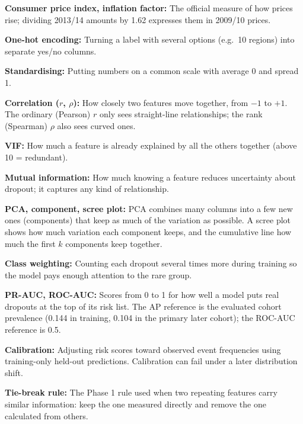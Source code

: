 \documentclass[conference,a4paper]{IEEEtran}
\begin{document}
{\newpage
\noindent\textbf{Consumer price index, inflation factor:} The official measure of how prices rise; dividing 2013/14 amounts by 1.62 expresses them in 2009/10 prices.\par\vspace{2pt}
\noindent\textbf{One-hot encoding:} Turning a label with several options (e.g.\ 10 regions) into separate yes/no columns.\par\vspace{2pt}
\noindent\textbf{Standardising:} Putting numbers on a common scale with average 0 and spread 1.\par\vspace{2pt}
\noindent\textbf{Correlation ($r$, $\rho$):} How closely two features move together, from $-1$ to $+1$. The ordinary (Pearson) $r$ only sees straight-line relationships; the rank (Spearman) $\rho$ also sees curved ones.\par\vspace{2pt}
\noindent\textbf{VIF:} How much a feature is already explained by all the others together (above 10 = redundant).\par\vspace{2pt}
\noindent\textbf{Mutual information:} How much knowing a feature reduces uncertainty about dropout; it captures any kind of relationship.\par\vspace{2pt}
\noindent\textbf{PCA, component, scree plot:} PCA combines many columns into a few new ones (components) that keep as much of the variation as possible. A scree plot shows how much variation each component keeps, and the cumulative line how much the first $k$ components keep together.\par\vspace{2pt}
\noindent\textbf{Class weighting:} Counting each dropout several times more during training so the model pays enough attention to the rare group.\par\vspace{2pt}
\noindent\textbf{PR-AUC, ROC-AUC:} Scores from 0 to 1 for how well a model puts real dropouts at the top of its risk list. The AP reference is the evaluated cohort prevalence (0.144 in training, 0.104 in the primary later cohort); the ROC-AUC reference is 0.5.\par\vspace{2pt}
\noindent\textbf{Calibration:} Adjusting risk scores toward observed event frequencies using training-only held-out predictions. Calibration can fail under a later distribution shift.\par\vspace{2pt}
\noindent\textbf{Tie-break rule:} The Phase 1 rule used when two repeating features carry similar information: keep the one measured directly and remove the one calculated from others.\par
}
\end{document}
